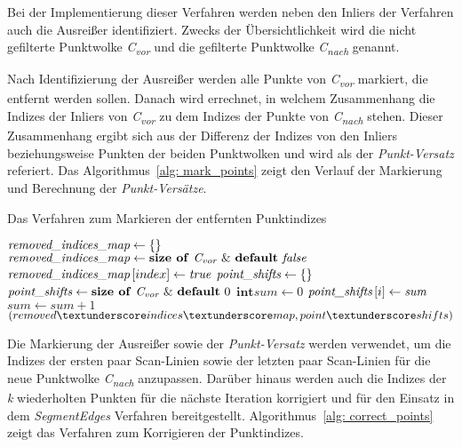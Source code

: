 Bei der Implementierung dieser Verfahren werden neben den Inliers der Verfahren auch die Ausreißer identifiziert. Zwecks der Übersichtlichkeit wird die nicht gefilterte Punktwolke \textit{C\textsubscript{vor}} und die gefilterte Punktwolke \textit{C\textsubscript{nach}} genannt. 

Nach Identifizierung der Ausreißer werden alle Punkte von \textit{C\textsubscript{vor}} markiert, die entfernt werden sollen. Danach wird errechnet, in welchem Zusammenhang die Indizes der Inliers von \textit{C\textsubscript{vor}} zu dem Indizes der Punkte von \textit{C\textsubscript{nach}} stehen. Dieser Zusammenhang ergibt sich aus der Differenz der Indizes von den Inliers beziehungsweise Punkten der beiden Punktwolken und wird als der \textit{Punkt-Versatz} referiert. Das Algorithmus~\ref{alg: mark_points} zeigt den Verlauf der Markierung und Berechnung der \textit{Punkt-Versätze}. 

\begin{algorithm}[h]
	\caption{Das Verfahren zum Markieren der entfernten Punktindizes}
	\label{alg: mark_points}
	\begin{algorithmic}[1]
		\State $\textit{removed\textunderscore indices\textunderscore map} \gets \text{\{\}}$
		\State $\textit{removed\textunderscore indices\textunderscore map} \gets \text{\textbf{size of} \textit{C\textsubscript{vor}} \& \textbf{default} \textit{false}}$
		\State $\textit{removed\textunderscore indices\textunderscore map} \left[index\right] \gets \textit{true}$
		\EndFor
		\State $\textit{point\textunderscore shifts} \gets \text{\{\}}$
		\State $\textit{point\textunderscore shifts} \gets \text{\textbf{size of} \textit{C\textsubscript{vor}} \& \textbf{default} 0}$
		\State $\textbf{int} \textit{sum} \gets 0$
		\State $\textit{point\textunderscore shifts}\left[i\right] \gets \textit{sum}$
		\Else
		\State $\textit{sum} \gets \textit{sum} + 1$
		\EndIf
		\EndFor
		\Return $(removed\textunderscore indices\textunderscore map, point\textunderscore shifts)$
		\EndFunction
	\end{algorithmic}
\end{algorithm}

Die Markierung der Ausreißer sowie der \textit{Punkt-Versatz} werden verwendet, um die Indizes der ersten paar Scan-Linien sowie der letzten paar Scan-Linien für die neue Punktwolke \textit{C\textsubscript{nach}} anzupassen. Darüber hinaus werden auch die Indizes der \textit{k} wiederholten Punkten für die nächste Iteration korrigiert und für den Einsatz in dem \textit{SegmentEdges} Verfahren bereitgestellt. Algorithmus~\ref{alg: correct_points} zeigt das Verfahren zum Korrigieren der Punktindizes.

